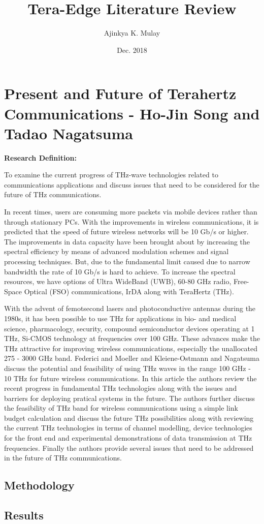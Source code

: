 \documentclass[12pt, letterpaper]{article}
\title{Tera-Edge Literature Review}
\author{Ajinkya K. Mulay}
\date{Dec. 2018}
\begin{document}
	\begin{titlepage}
		\maketitle
	\end{titlepage}
	
	\section{Present and Future of Terahertz Communications - Ho-Jin Song and Tadao Nagatsuma}
	\textbf{Research Definition:} 
	\par
	To examine the current progress of THz-wave technologies related to communications applications and discuss issues that need to be considered for the future of THz communications. 
	\par
	In recent times, users are consuming more packets via mobile devices rather than through stationary PCs. With the improvements in wireless communications, it is predicted that the speed of future wireless networks will be 10 Gb/s or higher. The improvements in data capacity have been brought about by increasing the spectral efficiency by means of advanced modulation schemes and signal processing techniques. But, due to the fundamental limit caused due to narrow bandwidth the rate of 10 Gb/s is hard to achieve. To increase the spectral resources, we have options of Ultra WideBand (UWB), 60-80 GHz radio, Free-Space Optical (FSO) communications, IrDA along with TeraHertz (THz).
	\par 
	With the advent of femotsecond lasers and photoconductive antennas during the 1980s, it has been possible to use THz for applications in bio- and medical science, pharmacology, security, compound semiconductor devices operating at 1 THz, Si-CMOS technology at frequencies over 100 GHz. These advances make the THz attractive for improving wireless communications, especially the unallocated 275 - 3000 GHz band. Federici and Moeller and Kleiene-Ostmann and Nagatsuma discuss the potential and feasibility of using THz waves in the range 100 GHz - 10 THz for future wireless communications. In this article the authors review the recent progress in fundamental THz technologies along with the issues and barriers for deploying pratical systems in the future. The authors further discuss the feasibility of THz band for wireless communications using a simple link budget calculation and discuss the future THz possibilities along with reviewing the current THz technologies in terms of channel modelling, device technologies for the front end and experimental demonstrations of data transmission at THz frequencies. Finally the authors provide several issues that need to be addressed in the future of THz communications. 
	\subsection{Methodology}
	\subsection{Results}
	
\end{document}
